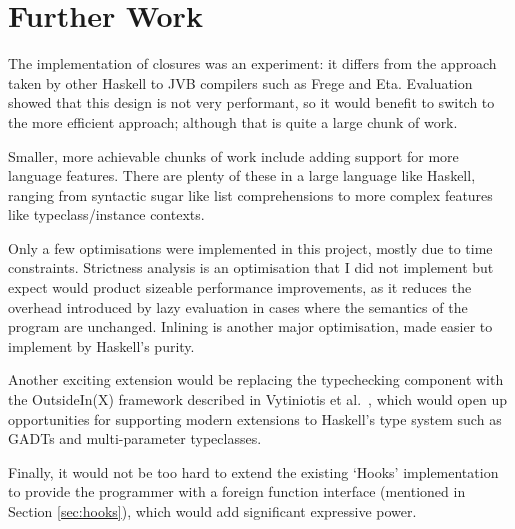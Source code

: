 \documentclass[dissertation.tex]{subfiles}
\begin{document}
\section{Further Work}
{
    The implementation of closures was an experiment: it differs from the approach taken by other Haskell to JVB compilers such as Frege and Eta. Evaluation showed that this design is not very performant, so it would benefit \compilername to switch to the more efficient approach; although that is quite a large chunk of work.

    Smaller, more achievable chunks of work include adding support for more language features. There are plenty of these in a large language like Haskell, ranging from syntactic sugar like list comprehensions to more complex features like typeclass/instance contexts.

    Only a few optimisations were implemented in this project, mostly due to time constraints. Strictness analysis is an optimisation that I did not implement but expect would product sizeable performance improvements, as it reduces the overhead introduced by lazy evaluation in cases where the semantics of the program are unchanged. Inlining is another major optimisation, made easier to implement by Haskell's purity.

    Another exciting extension would be replacing the typechecking component with the OutsideIn(X) framework described in Vytiniotis et al.\ \cite{OutsideIn}, which would open up opportunities for supporting modern extensions to Haskell's type system such as GADTs and multi-parameter typeclasses. 

    Finally, it would not be too hard to extend the existing `Hooks' implementation to provide the programmer with a foreign function interface (mentioned in Section \ref{sec:hooks}), which would add significant expressive power.
}
\end{document}
